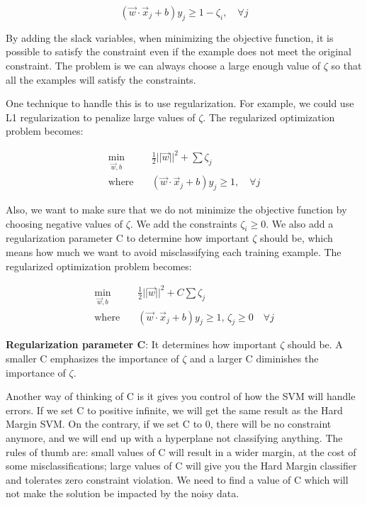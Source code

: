 \documentclass{article}
\begin{document}
\begin{equation}
(\vec{w} \cdot \vec{x}_j + b)y_j \geq 1 - \zeta_i, \quad \forall j \nonumber
\end{equation}

By adding the slack variables, when minimizing the objective function, it is possible to satisfy the constraint even if the example does not meet the original constraint. The problem is we can always choose a large enough value of $\zeta$ so that all the examples will satisfy the constraints.

One technique to handle this is to use regularization. 
For example, we could use L1 regularization to penalize large values of $\zeta$. The regularized optimization problem becomes:

\begin{align*}
\min_{\vec{w},b} & \quad \frac{1}{2} ||\vec{w}||^2  + \sum \zeta_j\\
\mathrm{where} & \quad (\vec{w} \cdot \vec{x}_j + b)y_j \geq 1, \quad \forall j
\end{align*}

Also, we want to make sure that we do not minimize the objective function by choosing negative values of $\zeta$. We add the constraints $\zeta_i \ge 0$. We also add a regularization parameter C to determine how important $\zeta$ should be, which means how much we want to avoid misclassifying each training example. The regularized optimization problem becomes:

\begin{align*}
\min_{\vec{w},b} & \quad \frac{1}{2} ||\vec{w}||^2  + C  \sum \zeta_j\\
\mathrm{where} & \quad (\vec{w} \cdot \vec{x}_j + b)y_j \geq 1, \, \zeta_j \ge 0 \quad \forall j
\end{align*}

\textbf{Regularization parameter C}:
It determines how important $\zeta$ should be. A smaller C emphasizes the importance of $\zeta$ and a larger C diminishes the importance of $\zeta$.

Another way of thinking of C is it gives you control of how the SVM will handle errors. If we set C to positive infinite, we will get the same result as the Hard Margin SVM. On the contrary, if we set C to 0, there will be no constraint anymore, and we will end up with a hyperplane not classifying anything. The rules of thumb are: small values of C will result in a wider margin, at the cost of some misclassifications; large values of C will give you the Hard Margin classifier and tolerates zero constraint violation. We need to find a value of C which will not make the solution be impacted by the noisy data.
\end{document}
